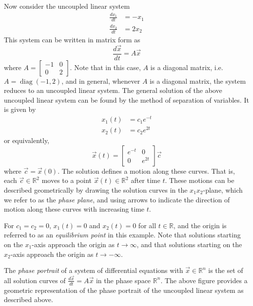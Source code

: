\documentclass[11pt]{book}
\theoremstyle{definition}\newtheorem{definition}[subsection]{Definition}
\theoremstyle{definition}\newtheorem{example}[subsection]{Example}
\theoremstyle{definition}\newtheorem{notation}[subsection]{Notation}
\theoremstyle{definition}\newtheorem{remark}[subsection]{Remark}
\theoremstyle{theorem}\newtheorem{theorem}[subsection]{Theorem}
\theoremstyle{theorem}\newtheorem{lemma}[subsection]{Lemma}
\theoremstyle{theorem}\newtheorem{proposition}[subsection]{Proposition}
\theoremstyle{theorem}\newtheorem{corollary}[subsection]{Corollary}
\theoremstyle{theorem}\newtheorem{case}{Case}
\theoremstyle{remark}\newtheorem{subcase}{Subcase}[case]
\newcommand{\R}{\mathbb{R}}
\DeclareMathOperator{\diag}{diag}
\begin{document}
Now consider the uncoupled linear system
\begin{align*}
    \frac{dx_1}{dt} &= -x_1 \\
    \frac{dx_2}{dt} &= 2x_2
\end{align*}
This system can be written in matrix form as
\begin{equation*}
    \frac{d\vec{x}}{dt} = A\vec{x}
\end{equation*}
where $A = \begin{bmatrix} -1 & 0 \\ 0 & 2 \end{bmatrix}$. Note that in this case, $A$ is a diagonal matrix, i.e. $A = \diag(-1, 2)$, and in general, whenever $A$ is a diagonal matrix, the system reduces to an uncoupled linear system. The general solution of the above uncoupled linear system can be found by the method of separation of variables. It is given by
\begin{align*}
    x_1(t) &= c_1e^{-t} \\
    x_2(t) &= c_2e^{2t}
\end{align*}
or equivalently,
\begin{equation*}
    \vec{x}(t) = \begin{bmatrix} e^{-t} & 0 \\ 0 & e^{2t} \end{bmatrix} \vec{c}
\end{equation*}
where $\vec{c} = \vec{x}(0)$. The solution defines a motion along these curves. That is, each $\vec{c} \in \R^2$ moves to a point $\vec{x}(t) \in \R^2$ after time $t$. These motions can be described geometrically by drawing the solution curves in the $x_1x_2$-plane, which we refer to as the \emph{phase plane}, and using arrows to indicate the direction of motion along these curves with increasing time $t$. 

For $c_1 = c_2 = 0$, $x_1(t) = 0$ and $x_2(t) = 0$ for all $t \in \R$, and the origin is referred to as an \emph{equilibrium point} in this example. Note that solutions starting on the $x_1$-axis approach the origin as $t \to \infty$, and that solutions starting on the $x_2$-axis approach the origin as $t \to -\infty$. 

The \emph{phase portrait} of a system of differential equations with $\vec{x} \in \R^n$ is the set of all solution curves of $\frac{d\vec{x}}{dt} = A\vec{x}$ in the phase space $\R^n$. The above figure provides a geometric representation of the phase portrait of the uncoupled linear system as described above. 
\end{document}
